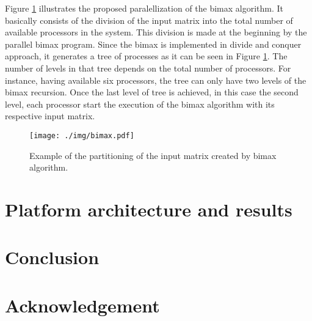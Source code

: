 \documentclass[a4paper,conference]{IEEEtran}
\begin{document}
Figure \ref{fig:parbimax} illustrates the proposed paralellization of the bimax algorithm. It basically consists of the division of the input matrix into the total number of available processors in the system. This division is made at the beginning by the parallel bimax program. Since the bimax is implemented in divide and conquer approach, it generates a tree of processes as it can be seen in Figure \ref{fig:parbimax}. The number of levels in that tree depends on the total number of processors. For instance, having available six processors, the tree can only have two levels of the bimax recursion. Once the last level of tree is achieved, in this case the second level, each processor start the execution of the bimax algorithm with its respective input matrix. 

\begin{figure}[ht!]
  \texttt{[image: ./img/bimax.pdf]}
  \caption{Example of the partitioning of the input matrix created by bimax algorithm.}
  \label{fig:parbimax}
\end{figure}


%
%
%
%



\section{Platform architecture and results}

\section{Conclusion}

\section{Acknowledgement}




\balance 
\end{document}
